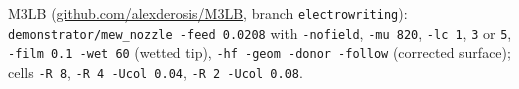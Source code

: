 \documentclass[10pt,a4paper]{article}
\begin{document}
\vfill
{\footnotesize\color{inkthree}\sffamily M3LB (\href{https://github.com/alexderosis/M3LB}{github.com/alexderosis/M3LB},
branch \texttt{electrowriting}): \texttt{demonstrator/mew\_nozzle -feed 0.0208} with \texttt{-nofield},
\texttt{-mu 820}, \texttt{-lc 1}, \texttt{3} or \texttt{5}, \texttt{-film 0.1 -wet 60} (wetted tip), \texttt{-hf -geom
-donor -follow} (corrected surface); cells \texttt{-R 8}, \texttt{-R 4 -Ucol 0.04}, \texttt{-R 2 -Ucol 0.08}.\par}
\end{document}
